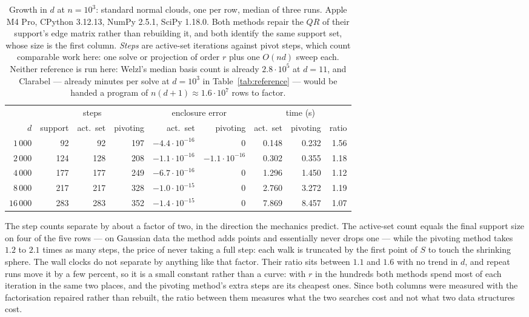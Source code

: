 \documentclass[10pt,a4paper]{article}
\theoremstyle{plain}
\begin{document}
\begin{table}[h]
\centering
\small
\setlength{\tabcolsep}{5pt}
\begin{tabular}{r rrr rr rrr}
  \toprule
  & \multicolumn{3}{c}{steps} & \multicolumn{2}{c}{enclosure error} & \multicolumn{3}{c}{time (s)} \\
  \cmidrule(lr){2-4}\cmidrule(lr){5-6}\cmidrule(lr){7-9}
  $d$ & support & act.\ set & pivoting & act.\ set & pivoting
      & act.\ set & pivoting & ratio \\
  \midrule
  $1\,000$  &  92 &  92 & 197 & $-4.4\cdot10^{-16}$ & $0$                 & 0.148 & 0.232 & 1.56 \\
  $2\,000$  & 124 & 128 & 208 & $-1.1\cdot10^{-16}$ & $-1.1\cdot10^{-16}$ & 0.302 & 0.355 & 1.18 \\
  $4\,000$  & 177 & 177 & 249 & $-6.7\cdot10^{-16}$ & $0$                 & 1.296 & 1.450 & 1.12 \\
  $8\,000$  & 217 & 217 & 328 & $-1.0\cdot10^{-15}$ & $0$                 & 2.760 & 3.272 & 1.19 \\
  $16\,000$ & 283 & 283 & 352 & $-1.4\cdot10^{-15}$ & $0$                 & 7.869 & 8.457 & 1.07 \\
  \bottomrule
\end{tabular}
\caption{Growth in $d$ at $n=10^3$: standard normal clouds, one per row, median of
three runs. Apple M4 Pro, CPython 3.12.13, NumPy 2.5.1, SciPy 1.18.0. Both methods
repair the $QR$ of their support's edge matrix rather than rebuilding it, and both
identify the same support set, whose size is the first column. \emph{Steps} are
active-set iterations against pivot steps, which count comparable work here: one
solve or projection of order $r$ plus one $O(nd)$ sweep each. Neither reference is
run here: Welzl's median basis count is already $2.8\cdot10^5$ at $d=11$, and
Clarabel --- already minutes per solve at $d=10^3$ in Table~\ref{tab:reference} ---
would be handed a program of $n(d+1)\approx1.6\cdot10^7$ rows to factor.}
\label{tab:highd}
\end{table}

The step counts separate by about a factor of two, in the direction the mechanics
predict. The active-set count equals the final support size on four of the five
rows --- on Gaussian data the method adds points and essentially never drops one
--- while the pivoting method takes $1.2$ to $2.1$ times as many steps, the price
of never taking a full step: each walk is truncated by the first point of $S$ to
touch the shrinking sphere. The wall clocks do not separate by anything like that
factor. Their ratio sits between $1.1$ and $1.6$ with no trend in $d$, and repeat
runs move it by a few percent, so it is a small constant rather than a curve: with
$r$ in the hundreds both methods spend most of each iteration in the same two
places, and the pivoting method's extra steps are its cheapest ones. Since both
columns were measured with the factorisation repaired rather than rebuilt, the
ratio between them measures what the two searches cost and not what two data
structures cost.
\end{document}
